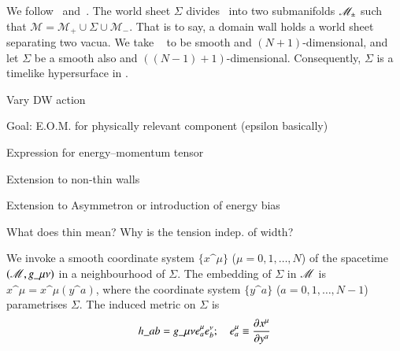 



\newcommand*\hypsurf{\ensuremath{\varSigma}}    %







We follow~\citet{garrigaPerturbationsDomainWalls1991} and~\citet{ishibashiEquationMotionDomain1999}. The world sheet $\hypsurf$ divides \Manifold~into two submanifolds $\mathscr{M}_{\pm}$ such that $\mathscr{M} = \mathscr{M}_+ \cup  \hypsurf \cup \mathscr{M}_-$. That is to say, a domain wall holds a world sheet separating two vacua. We take \Manifold~ to be smooth and $(N+1)$-dimensional, and let $\hypsurf$ be a smooth also and $((N-1)+1)$-dimensional. Consequently, $\hypsurf$ is a timelike hypersurface in \Manifold. 


%


\begin{bullets}
    \item Vary DW action
    \item Goal: E.O.M. for physically relevant component (epsilon basically)
    \item Expression for energy--momentum tensor
    \item Extension to non-thin walls 
    \item Extension to Asymmetron or introduction of energy bias
    \item What does thin mean? Why is the tension indep. of width?
\end{bullets}


We invoke a smooth coordinate system $\{x\^\mu\}$ ($\mu=0,1,\dots,N$) of the spacetime $(\mathscr{M}, g\_{\mu\nu})$ in a neighbourhood of $\hypsurf$. The embedding of $\hypsurf$ in $\mathscr{M}$ is $x\^\mu = x\^\mu(y\^a)$, where the coordinate system $\{y\^a\}$ ($a=0,1,\dots,N-1$) parametrises $\hypsurf$.
The induced metric on $\hypsurf$ is
\begin{equation}\label{eq:pertwalls:thinwall:induced_metrid}
    h\_{ab} = g\_{\mu\nu} e^\mu_a e^\nu_b; \quad e^\mu_a \equiv \pdv{x\^\mu}{y\^a}%
\end{equation} 


